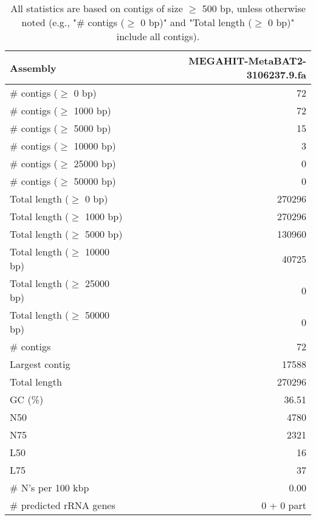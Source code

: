 \documentclass[12pt,a4paper]{article}
\begin{document}
\begin{table}[ht]
\begin{center}
\caption{All statistics are based on contigs of size $\geq$ 500 bp, unless otherwise noted (e.g., "\# contigs ($\geq$ 0 bp)" and "Total length ($\geq$ 0 bp)" include all contigs).}
\begin{tabular}{|l*{1}{|r}|}
\hline
Assembly & MEGAHIT-MetaBAT2-3106237.9.fa \\ \hline
\# contigs ($\geq$ 0 bp) & 72 \\ \hline
\# contigs ($\geq$ 1000 bp) & 72 \\ \hline
\# contigs ($\geq$ 5000 bp) & 15 \\ \hline
\# contigs ($\geq$ 10000 bp) & 3 \\ \hline
\# contigs ($\geq$ 25000 bp) & 0 \\ \hline
\# contigs ($\geq$ 50000 bp) & 0 \\ \hline
Total length ($\geq$ 0 bp) & 270296 \\ \hline
Total length ($\geq$ 1000 bp) & 270296 \\ \hline
Total length ($\geq$ 5000 bp) & 130960 \\ \hline
Total length ($\geq$ 10000 bp) & 40725 \\ \hline
Total length ($\geq$ 25000 bp) & 0 \\ \hline
Total length ($\geq$ 50000 bp) & 0 \\ \hline
\# contigs & 72 \\ \hline
Largest contig & 17588 \\ \hline
Total length & 270296 \\ \hline
GC (\%) & 36.51 \\ \hline
N50 & 4780 \\ \hline
N75 & 2321 \\ \hline
L50 & 16 \\ \hline
L75 & 37 \\ \hline
\# N's per 100 kbp & 0.00 \\ \hline
\# predicted rRNA genes & 0 + 0 part \\ \hline
\end{tabular}
\end{center}
\end{table}
\end{document}
